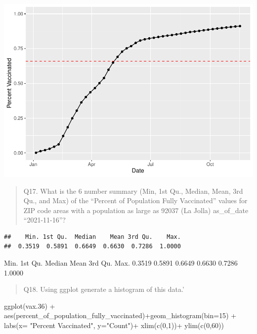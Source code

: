 \documentclass[
]{article}
\newenvironment{Shaded}{\begin{snugshade}}{\end{snugshade}}
\newcommand{\AttributeTok}[1]{\textcolor[rgb]{0.77,0.63,0.00}{#1}}
\newcommand{\DecValTok}[1]{\textcolor[rgb]{0.00,0.00,0.81}{#1}}
\newcommand{\FloatTok}[1]{\textcolor[rgb]{0.00,0.00,0.81}{#1}}
\newcommand{\FunctionTok}[1]{\textcolor[rgb]{0.00,0.00,0.00}{#1}}
\newcommand{\NormalTok}[1]{#1}
\newcommand{\SpecialCharTok}[1]{\textcolor[rgb]{0.00,0.00,0.00}{#1}}
\newcommand{\StringTok}[1]{\textcolor[rgb]{0.31,0.60,0.02}{#1}}
\begin{document}
\includegraphics{Vaccine-rate-mini-project_files/figure-latex/unnamed-chunk-32-1.pdf}

\begin{quote}
Q17. What is the 6 number summary (Min, 1st Qu., Median, Mean, 3rd Qu.,
and Max) of the ``Percent of Population Fully Vaccinated'' values for
ZIP code areas with a population as large as 92037 (La Jolla)
as\_of\_date ``2021-11-16''?
\end{quote}

\begin{Shaded}
\end{Shaded}

\begin{verbatim}
##    Min. 1st Qu.  Median    Mean 3rd Qu.    Max. 
##  0.3519  0.5891  0.6649  0.6630  0.7286  1.0000
\end{verbatim}

Min. 1st Qu. Median Mean 3rd Qu. Max. 0.3519 0.5891 0.6649 0.6630 0.7286
1.0000

\begin{quote}
Q18. Using ggplot generate a histogram of this data.'
\end{quote}

\begin{Shaded}
\begin{Highlighting}[]
\FunctionTok{ggplot}\NormalTok{(vax}\FloatTok{.36}\NormalTok{) }\SpecialCharTok{+}
  \FunctionTok{aes}\NormalTok{(percent\_of\_population\_fully\_vaccinated)}\SpecialCharTok{+}\FunctionTok{geom\_histogram}\NormalTok{(}\AttributeTok{bin=}\DecValTok{15}\NormalTok{) }\SpecialCharTok{+} 
  \FunctionTok{labs}\NormalTok{(}\AttributeTok{x=} \StringTok{"Percent Vaccinated"}\NormalTok{, }\AttributeTok{y=}\StringTok{"Count"}\NormalTok{)}\SpecialCharTok{+} 
  \FunctionTok{xlim}\NormalTok{(}\FunctionTok{c}\NormalTok{(}\DecValTok{0}\NormalTok{,}\DecValTok{1}\NormalTok{))}\SpecialCharTok{+}
  \FunctionTok{ylim}\NormalTok{(}\FunctionTok{c}\NormalTok{(}\DecValTok{0}\NormalTok{,}\DecValTok{60}\NormalTok{))}
\end{Highlighting}
\end{Shaded}
\end{document}
